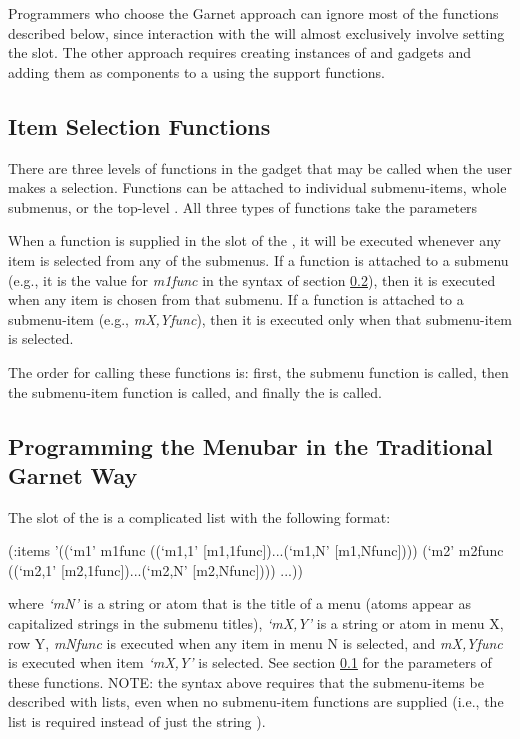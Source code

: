 Programmers who choose the Garnet approach can ignore most of the functions
described below, since interaction with the  will
almost exclusively involve setting the  slot.  The other approach
requires creating instances of  and  gadgets
and adding them as components to a  using the support functions.


\subsection{Item Selection Functions}
\label{item-selection-functions}

There are three levels of functions in the  gadget that may be
called when the user makes a selection.  Functions
can be attached to individual submenu-items, whole submenus, or the top-level
.  All three types of functions take the parameters

When a function is supplied in the  slot of the
, it will be executed whenever any item is selected from any
of the submenus.  If a function is attached to a submenu (e.g., it is the
value for {\it m1func} in the  syntax of section
\ref{garnet-menubar-programming}), then it is executed when any item is
chosen from that submenu.  If a function is attached to a submenu-item
(e.g., {\it mX,Yfunc}), then it is executed only when that submenu-item is
selected.

The order for calling these functions is:  first, the submenu function is
called, then the submenu-item function is called, and finally the
 is called.



\subsection{Programming the Menubar in the Traditional Garnet Way}
\label{garnet-menubar-programming}

The  slot of the  is a complicated list with the
following format:
\begin{programexample}
(:items '((`m1' m1func ((`m1,1' [m1,1func])...(`m1,N' [m1,Nfunc])))
          (`m2' m2func ((`m2,1' [m2,1func])...(`m2,N' [m2,Nfunc])))
          ...))
\end{programexample}
where {\it `mN'} is a string or atom that is the title of a menu (atoms
appear as capitalized strings in the submenu titles),
{\it `mX,Y'}
is a string or atom in menu X, row Y, {\it mNfunc} is executed when any item in
menu N is selected, and {\it mX,Yfunc} is executed when item {\it `mX,Y'} is
selected.  See section \ref{item-selection-functions} for the parameters of
these functions.  NOTE:  the syntax above requires that the submenu-items be
described with lists, even when no submenu-item functions are supplied (i.e.,
the list  is required instead of just the string ).

